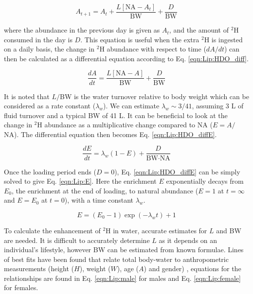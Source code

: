 \begin{equation}
    A_{t+1} = A_t + \frac{L[\textrm{NA} - A_t]}{\textrm{BW}} + \frac{D}{\textrm{BW}}
    \label{eqn:Lip:HDO}
\end{equation}

\noindent where the abundance in the previous day is given as $A_t$, and the amount of $^2$H consumed in the day is $D$. This equation is useful when the extra $^2$H is ingested on a daily basis, the change in $^2$H abundance with respect to time ($dA/dt$) can then be calculated as a differential equation according to Eq. \ref{eqn:Lip:HDO_diff}.

\begin{equation}
    \frac{dA}{dt} = \frac{L[\textrm{NA} - A]}{\textrm{BW}} + \frac{D}{\textrm{BW}}
    \label{eqn:Lip:HDO_diff}
\end{equation}

\noindent It is noted that $L/$BW is the water turnover  relative to body weight which can be considered as a rate constant ($\lambda_w$). We can estimate $\lambda_w\sim 3/41$, assuming 3 L of fluid turnover and a typical BW of 41 L. It can be beneficial to look at the change in $^2$H abundance as a multiplicative change compared to NA ($E=A/$NA). The differential equation then becomes Eq. \ref{eqn:Lip:HDO_diffE}.

\begin{equation}
    \frac{dE}{dt} = \lambda_w(1-E) + \frac{D}{\textrm{BW} \cdot \textrm{NA}}
    \label{eqn:Lip:HDO_diffE}
\end{equation}

\noindent Once the loading period ends ($D=0$), Eq. \ref{eqn:Lip:HDO_diffE} can be simply solved to give Eq. \ref{eqn:Lip:E}. Here the enrichment $E$ exponentially decays from $E_0$, the enrichment at the end of loading, to natural abundance ($E=1$ at $t=\infty$ and $E=E_0$ at $t=0$), with a time constant $\lambda_w$.

\begin{equation}
    E = (E_0 - 1)\exp(-\lambda_wt) + 1
    \label{eqn:Lip:E}
\end{equation}

\noindent To calculate the enhancement of $^2$H in water, accurate estimates for $L$ and BW are needed. It is difficult to accurately determine $L$ as it depends on an individual's lifestyle, however BW can be estimated from known formulae. Lines of best fits have been found that relate total body-water to anthropometric measurements (height ($H$), weight ($W$), age ($A$) and gender) \cite{Watson1980TotalMeasurements}, equations for the relationships are found in Eq. \ref{eqn:Lip:male} for males and Eq. \ref{eqn:Lip:female} for females.

